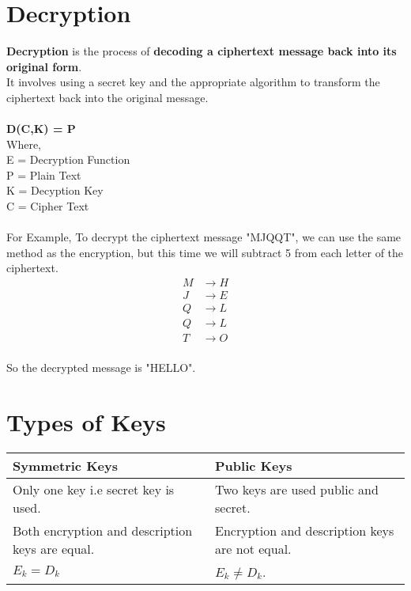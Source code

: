 \documentclass[11pt]{article}
\begin{document}
\section*{Decryption}
\textbf{Decryption} is the process of \textbf{decoding a ciphertext message back into its original form}. 
\\
It involves using a secret key and the appropriate algorithm to transform the ciphertext back into the original message.
\\ \\ 
\textbf{D(C,K) = P} \\
Where, \\
E = Decryption Function \\
P = Plain Text \\
K = Decyption Key \\
C = Cipher Text \\
\\
For Example, To decrypt the ciphertext message "MJQQT", we can use the same method as the encryption, but this time we will subtract 5 from each letter of the ciphertext.
\begin{align*}
M &\rightarrow H \\
J &\rightarrow E \\
Q &\rightarrow L \\
Q &\rightarrow L \\
T &\rightarrow O
\end{align*}
\\
So the decrypted message is "HELLO".

\section*{Types of Keys}
\begin{tabular}{ | l | l | }
\hline
Symmetric Keys & Public Keys  \\
\hline
Only one key i.e secret key is used. & Two keys are used public and secret.\\
\hline
Both encryption and description keys are equal. & Encryption and description keys are not equal. \\ 
$ E_k = D_k $ & $ E_k \neq D_k $. \\
\hline
\end{tabular}

\end{document}
